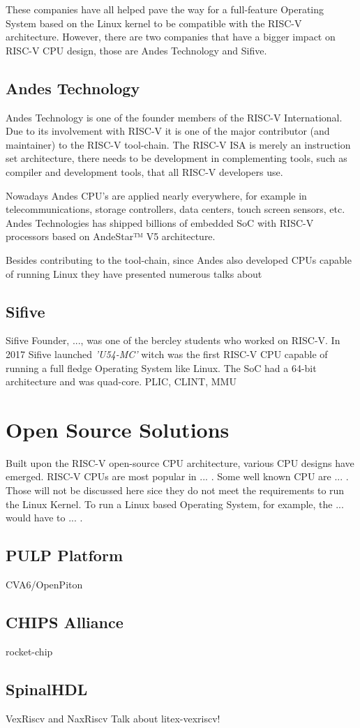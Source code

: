 These companies have all helped pave the way for a full-feature Operating System based on the Linux kernel to be compatible with the RISC-V architecture. However, there are two companies that have a bigger impact on RISC-V CPU design, those are Andes Technology and Sifive.

\subsection{Andes Technology}
Andes Technology is one of the founder members of the RISC-V International. Due to its involvement with RISC-V it is one of the major contributor (and maintainer) to the RISC-V tool-chain. The RISC-V ISA is merely an instruction set architecture, there needs to be development in complementing tools, such as compiler and development tools, that all RISC-V developers use.

Nowadays Andes CPU's are applied nearly everywhere, for example in telecommunications, storage controllers, data centers, touch screen sensors, etc. Andes Technologies has shipped billions of embedded SoC with RISC-V processors based on AndeStar™ V5 architecture. 

Besides contributing to the tool-chain, since Andes also developed CPUs capable of running Linux they have presented numerous talks about

\subsection{Sifive}
Sifive Founder, ..., was one of the bercley students who worked on RISC-V.
In 2017 Sifive launched \textit{'U54-MC'} witch was the first RISC-V CPU capable of running a full fledge Operating System like Linux. The SoC had a 64-bit architecture and was quad-core.
PLIC, CLINT, MMU


\section{Open Source Solutions}
Built upon the RISC-V open-source CPU architecture, various CPU designs have emerged. RISC-V CPUs are most popular in ... . Some well known CPU are ... . Those will not be discussed here sice they do not meet the requirements to run the Linux Kernel. To run a Linux based Operating System, for example, the ... would have to ... .

\subsection{PULP Platform}
CVA6/OpenPiton
\subsection{CHIPS Alliance}
rocket-chip
\subsection{SpinalHDL}
VexRiscv and NaxRiscv
Talk about litex-vexriscv!